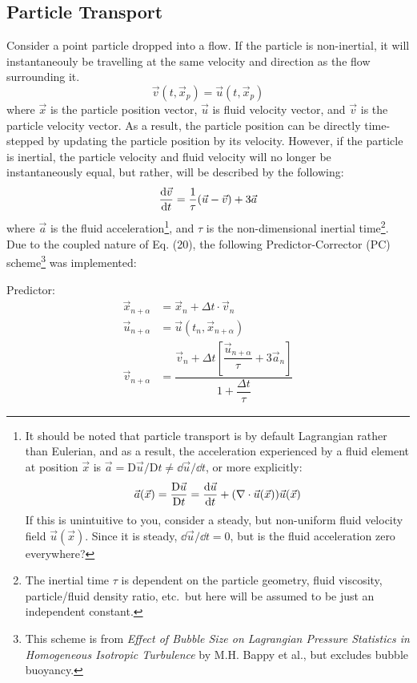 \documentclass[12pt, reqno]{amsart}
\begin{document}
\subsection{Particle Transport}
Consider a point particle dropped into a flow. If the particle is non-inertial, it will instantaneouly be travelling at the same velocity and direction as the flow surrounding it.
\begin{equation}
    \vec{v}(t, \vec{x}_p) = \vec{u}(t, \vec{x}_p)
\end{equation}
where $\vec{x}$ is the particle position vector, $\vec{u}$ is fluid velocity vector, and $\vec{v}$ is the particle velocity vector. As a result, the particle position can be directly time-stepped by updating the particle position by its velocity. 
However, if the particle is inertial, the particle velocity and fluid velocity will no longer be instantaneously equal, but rather, will be described by the following:
\begin{equation}
    \dv{\vec{v}}{t} = \frac{1}{\tau} (\vec{u} - \vec{v}) + 3 
    \vec{a}
\end{equation}
where $\vec{a}$ is the fluid acceleration\footnote{It should be noted that particle transport is by default Lagrangian rather than Eulerian, and as a result, the acceleration experienced by a fluid element at position $\vec{x}$ is $\vec{a} = \mathrm{D} \vec{u}/\mathrm{D} t \neq \dd \vec{u}/ \dd t$, or more explicitly:
\[ \vec{a}(\vec{x}) = \frac{\mathrm{D} \vec{u}}{\mathrm{D} t} = \dv{\vec{u}}{t} + (\nabla \cdot \vec{u}(\vec{x}))\vec{u}(\vec{x}) \] If this is unintuitive to you, consider a steady, but non-uniform fluid velocity field $\vec{u}(\vec{x})$. Since it is steady, $\dd \vec{u} / \dd t = 0$, but is the fluid acceleration zero everywhere?}, and $\tau$ is the non-dimensional inertial time\footnote{The inertial time $\tau$ is dependent on the particle geometry, fluid viscosity, particle/fluid density ratio, etc.\ but here will be assumed to be just an independent constant.}. Due to the coupled nature of Eq. (20), the following Predictor-Corrector (PC) scheme\footnote{This scheme is from \textit{Effect of Bubble Size on Lagrangian Pressure
Statistics in Homogeneous Isotropic Turbulence} by M.H. Bappy et al., but excludes bubble buoyancy.} was implemented:

Predictor:
\begin{align}
    \vec{x}_{n + \alpha} &= \vec{x}_n + \Delta t \cdot \vec{v}_n\\
    \vec{u}_{n + \alpha} &= \vec{u}(t_n, \vec{x}_{n + \alpha})\\
    \vec{v}_{n + \alpha} &= \dfrac{\vec{v}_n + \Delta t \left[ \dfrac{\vec{u}_{n + \alpha}}{\tau} + 3\vec{a}_n \right]}{1 + \dfrac{\Delta t}{\tau}}
\end{align}
\end{document}
